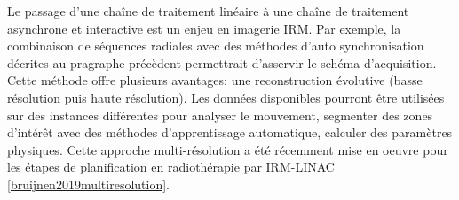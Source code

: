 
Le passage d’une chaîne de traitement linéaire à une chaîne de traitement asynchrone et interactive est un enjeu en imagerie IRM. Par exemple, la combinaison de séquences radiales avec des méthodes d’auto synchronisation décrites au pragraphe précèdent permettrait d’asservir le schéma d’acquisition. Cette méthode offre plusieurs avantages: une reconstruction évolutive (basse résolution puis haute résolution). Les données disponibles pourront être utilisées sur des instances différentes pour analyser le mouvement, segmenter des zones d’intérêt avec des méthodes d’apprentissage automatique, calculer des paramètres physiques. Cette approche multi-résolution a été récemment mise en oeuvre pour les étapes de planification en radiothérapie par IRM-\ac{LINAC} \ref{bruijnen2019multiresolution}.\\
